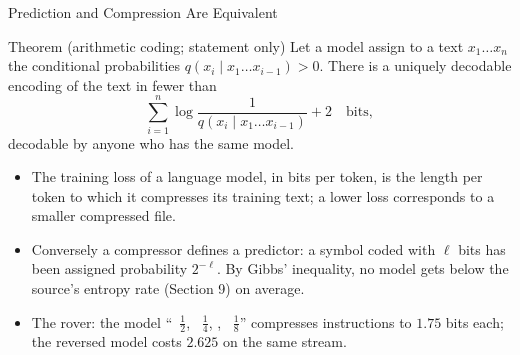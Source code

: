 \begin{frame}{Prediction and Compression Are Equivalent}
  \small
  \begin{block}{Theorem (arithmetic coding; statement only)}
    Let a model assign to a text $x_1\dots x_n$ the conditional probabilities $q(x_i\mid x_1\dots x_{i-1})>0$. There is a uniquely decodable encoding of the text in fewer than
    \[
      \sum_{i=1}^n\log\frac1{q(x_i\mid x_1\dots x_{i-1})}+2\quad\text{bits},
    \]
    decodable by anyone who has the same model.
  \end{block}
  \begin{itemize}
    \item The training loss of a language model, in bits per token, is the length per token to which it compresses its training text; a lower loss corresponds to a smaller compressed file.
    \item Conversely a compressor defines a predictor: a symbol coded with $\ell$ bits has been assigned probability $2^{-\ell}$. By Gibbs' inequality, no model gets below the source's entropy rate (Section 9) on average.
    \item The rover: the model ``\up\ $\tfrac12$, \down\ $\tfrac14$, \lft, \rgt\ $\tfrac18$'' compresses instructions to $1.75$ bits each; the reversed model costs $2.625$ on the same stream.
  \end{itemize}
\end{frame}

